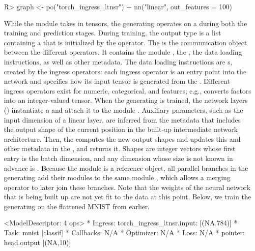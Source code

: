 \documentclass[article,shortnames]{jss}
\theoremstyle{definition}
\renewenvironment{CodeChunk}{\par\addvspace{0.6\baselineskip}\noindent\begin{minipage}{\linewidth}}{\end{minipage}\par\vspace{0.6\baselineskip}}
\begin{document}
\begin{CodeChunk}
\begin{CodeInput}
R> graph <- po("torch_ingress_ltnsr") %
+    nn("linear", out_features = 100) %
\end{CodeInput}
\end{CodeChunk}

While the module  takes in tensors, the generating  operates on a  during both the training and prediction stages.
During training, the output type is a list containing a  that is initialized by the  operator.
The  is the communication object between the different  operators.
It contains the module , the , the data loading instructions, as well as other metadata.
The data loading instructions are s, created by the ingress operators: each ingress operator is an entry point into the network and specifies how its input tensor is generated from the .
Different ingress operators exist for numeric, categorical, and  features; e.g.,  converts factors into an integer-valued tensor.
When the generating  is trained, the network layers () instantiate a  and attach it to the module .
Auxiliary parameters, such as the input dimension of a linear layer, are inferred from the metadata that includes the output shape of the current position in the built-up intermediate network architecture.
Then, the  computes the new output shapes and updates this and other metadata in the , and returns it.
Shapes are integer vectors whose first entry is the batch dimension, and any dimension whose size is not known in advance is .
Because the module  is a reference object, all parallel branches in the generating  add their modules to the same module , which allows a merging operator to later join these branches.
Note that the weights of the neural network that is being built up are not yet fit to the data at this point.
Below, we train the generating  on the flattened MNIST  from earlier.

\begin{CodeChunk}
\begin{CodeOutput}
<ModelDescriptor: 4 ops>
* Ingress:  torch_ingress_ltnsr.input: [(NA,784)]
* Task:  mnist [classif]
* Callbacks:  N/A
* Optimizer:  N/A
* Loss:  N/A
* pointer:  head.output [(NA,10)]
\end{CodeOutput}
\end{CodeChunk}
\end{document}
